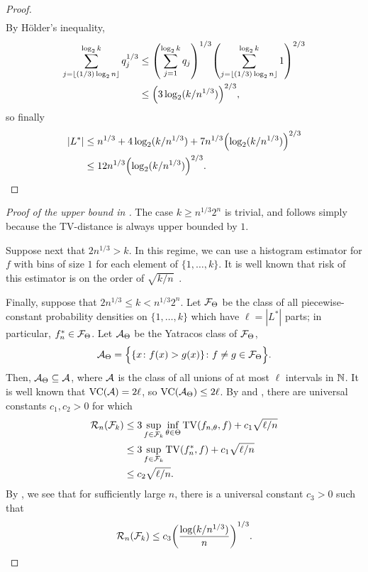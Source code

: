 \begin{proof}
\begin{align*}
  \end{align*}
  By H\"{o}lder's inequality,
  \begin{align*}
    \sum_{j = \floor{(1/3) \log_2 n}}^{\log_2 k} q_{j}^{1/3} &\le {\left( \sum_{j = 1}^{\log_2 k} q_j \right)}^{1/3} {\left( \sum_{j = \floor{(1/3) \log_2 n}}^{\log_2 k} 1 \right)}^{2/3} \\
                                                                  &\le {\left(3 \log_2 (k/n^{1/3}) \right)}^{2/3} , 
  \end{align*}
  so finally
  \begin{align*}
    |L^*| &\le n^{1/3} + 4 \log_2 (k/n^{1/3}) + 7 n^{1/3} {\left( \log_2 (k/n^{1/3}) \right)}^{2/3} \\
        &\le 12 n^{1/3} {\left( \log_2 (k/n^{1/3}) \right)}^{2/3} . \qedhere
  \end{align*}
\end{proof}

\begin{proof}[Proof of the upper bound in ]
  The case $k \ge n^{1/3} 2^n$ is trivial, and follows simply because
  the TV-distance is always upper bounded by $1$.

  Suppose next that $2 n^{1/3} > k$. In this regime, we can use a
  histogram estimator for $f$ with bins of size $1$ for each element
  of $\{1, \dots, k\}$. It is well known that risk of this estimator
  is on the order of $\sqrt{k/n}$~\cite{comb-methods}.

  Finally, suppose that $2 n^{1/3} \le k < n^{1/3} 2^n$. Let
  $\mathcal{F}_\Theta$ be the class of all piecewise-constant probability
  densities on $\{1, \dots, k\}$ which have $\ell = |L^*|$ parts; in
  particular, $f^*_n \in \mathcal{F}_\Theta$. Let $\mathcal{A}_\Theta$ be the Yatracos
  class of $\mathcal{F}_\Theta$,
  \[
    \mathcal{A}_\Theta = \Bigl\{ \{x \colon f(x) > g(x)\} \colon f \neq g \in \mathcal{F}_\Theta\Bigr\} .
  \]
  Then, $\mathcal{A}_\Theta \subseteq \mathcal{A}$, where $\mathcal{A}$ is the class of all
  unions of at most $\ell$ intervals in $\mathbb{N}$. It is well known that
  $\operatorname{VC}(\mathcal{A}) = 2\ell$, so $\operatorname{VC}(\mathcal{A}_\Theta) \le 2\ell$. By
   and , there are
  universal constants $c_1, c_2 > 0$ for which
  \begin{align*}
    \sR_n(\sF_k) &\le 3 \sup_{f \in \sF_k} \inf_{\theta \in \Theta} \TV(f_{n, \theta}, f) + c_1 \sqrt{\ell/n} \\
                 &\le 3 \sup_{f \in \sF_k} \TV(f^*_n, f) + c_1 \sqrt{\ell/n} \\
                 &\le c_2 \sqrt{\ell/n} .
  \end{align*}
  By , we see that for sufficiently large $n$,
  there is a universal constant $c_3 > 0$ such that
  \[
    \sR_n(\sF_k) \le c_3 {\left( \frac{\log (k/n^{1/3})}{n} \right)}^{1/3} . \qedhere
  \]
\end{proof}

